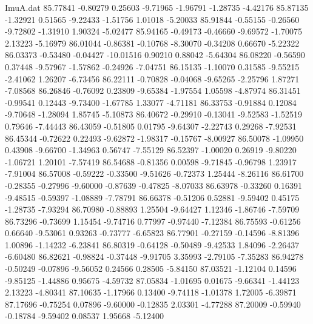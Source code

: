 \begin{filecontents}{ImuA.dat}
  85.77841   -0.80279    0.25603   -9.71965   -1.96791   -1.28735   -4.42176
  85.87135   -1.32921    0.51565   -9.22433   -1.51756    1.01018   -5.20033
  85.91844   -0.55155   -0.26560   -9.72802   -1.31910    1.90324   -5.02477
  85.94165   -0.49173   -0.46660   -9.69572   -1.70075    2.13223   -5.16979
  86.01044   -0.86381   -0.10768   -8.30070   -0.34208    0.66670   -5.22322
  86.03373   -0.53480   -0.04427  -10.01516    0.90210    0.88042   -5.64304
  86.08220   -0.56590    0.37448   -9.57967   -1.57862   -0.24926   -7.04751
  86.15135   -1.10070    0.31585   -9.55215   -2.41062    1.26207   -6.73456
  86.22111   -0.70828   -0.04068   -9.65265   -2.25796    1.87271   -7.08568
  86.26846   -0.76092    0.23809   -9.65384   -1.97554    1.05598   -4.87974
  86.31451   -0.99541    0.12443   -9.73400   -1.67785    1.33077   -4.71181
  86.33753   -0.91884    0.12084   -9.70648   -1.28094    1.85745   -5.10873
  86.40672   -0.29910   -0.13041   -9.52583   -1.52519    0.79646   -7.44443
  86.43059   -0.51805    0.01795   -9.64307   -2.22743    0.29268   -7.92531
  86.45344   -0.72622    0.22493   -9.62872   -1.98317   -0.15767   -8.00927
  86.50078   -1.09950    0.43908   -9.66700   -1.34963    0.56747   -7.55129
  86.52397   -1.00020    0.26919   -9.80220   -1.06721    1.20101   -7.57419
  86.54688   -0.81356    0.00598   -9.71845   -0.96798    1.23917   -7.91004
  86.57008   -0.59222   -0.33500   -9.51626   -0.72373    1.25444   -8.26116
  86.61700   -0.28355   -0.27996   -9.60000   -0.87639   -0.47825   -8.07033
  86.63978   -0.33260    0.16391   -9.48515   -0.59397   -1.08889   -7.78791
  86.66378   -0.51206    0.52881   -9.59402    0.45175   -1.28735   -7.93294
  86.70980   -0.88893    1.25504   -9.64427    1.12346   -1.86746   -7.59709
  86.73296   -0.73699    1.15454   -9.74716    0.77997   -0.97440   -7.12384
  86.75593   -0.61256    0.66640   -9.53061    0.93263   -0.73777   -6.65823
  86.77901   -0.27159   -0.14596   -8.81396    1.00896   -1.14232   -6.23841
  86.80319   -0.64128   -0.50489   -9.42533    1.84096   -2.26437   -6.60480
  86.82621   -0.98824   -0.37448   -9.91705    3.35993   -2.79105   -7.35283
  86.94278   -0.50249   -0.07896   -9.56052    0.24566    0.28505   -5.84150
  87.03521   -1.12104    0.14596   -9.85125   -1.44886    0.95675   -4.59732
  87.05834   -1.01695    0.01675   -9.66341   -1.44123    2.13223   -4.80341
  87.10635   -1.17966    0.13400   -9.74118   -1.01378    1.72005   -6.39871
  87.17696   -0.75254    0.07896   -9.60000   -0.12835    2.03301   -4.77288
  87.20009   -0.59940   -0.18784   -9.59402    0.08537    1.95668   -5.12400

\end{filecontents}
